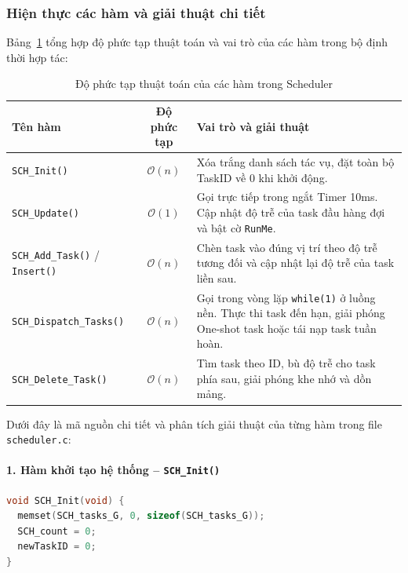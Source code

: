 \subsubsection{Hiện thực các hàm và giải thuật chi tiết}
Bảng~\ref{tab:scheduler_complexity} tổng hợp độ phức tạp thuật toán và vai trò của các hàm trong bộ định thời hợp tác:

\begin{table}[H]
\centering
\small
\setlength{\tabcolsep}{4pt}
\renewcommand{\arraystretch}{1.25}
\begin{tabularx}{\textwidth}{|l|c|>{\raggedright\arraybackslash}X|}
\hline
\textbf{Tên hàm} & \textbf{Độ phức tạp} & \textbf{Vai trò và giải thuật} \\ \hline
\texttt{SCH\_Init()} & $\mathcal{O}(n)$ & Xóa trắng danh sách tác vụ, đặt toàn bộ TaskID về 0 khi khởi động. \\ \hline
\texttt{SCH\_Update()} & $\mathcal{O}(1)$ & Gọi trực tiếp trong ngắt Timer 10ms. Cập nhật độ trễ của task đầu hàng đợi và bật cờ \texttt{RunMe}. \\ \hline
\texttt{SCH\_Add\_Task()} / \texttt{Insert()} & $\mathcal{O}(n)$ & Chèn task vào đúng vị trí theo độ trễ tương đối và cập nhật lại độ trễ của task liền sau. \\ \hline
\texttt{SCH\_Dispatch\_Tasks()} & $\mathcal{O}(n)$ & Gọi trong vòng lặp \texttt{while(1)} ở luồng nền. Thực thi task đến hạn, giải phóng One-shot task hoặc tái nạp task tuần hoàn. \\ \hline
\texttt{SCH\_Delete\_Task()} & $\mathcal{O}(n)$ & Tìm task theo ID, bù độ trễ cho task phía sau, giải phóng khe nhớ và dồn mảng. \\ \hline
\end{tabularx}
\caption{Độ phức tạp thuật toán của các hàm trong Scheduler}
\label{tab:scheduler_complexity}
\end{table}

Dưới đây là mã nguồn chi tiết và phân tích giải thuật của từng hàm trong file \texttt{scheduler.c}:

\paragraph{1. Hàm khởi tạo hệ thống -- \texttt{SCH\_Init()}}
\begin{lstlisting}[language=C, caption={Mã nguồn hàm SCH\_Init}]
void SCH_Init(void) {
  memset(SCH_tasks_G, 0, sizeof(SCH_tasks_G));
  SCH_count = 0;
  newTaskID = 0;
}
\end{lstlisting}


